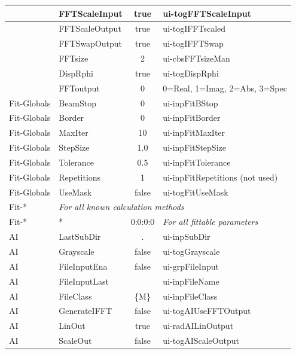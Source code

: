\documentclass[11pt]{article} %
\begin{document}
\begin{longtable}{|l|l|c|l|}
 & FFTScaleInput & true & ui-togFFTScaleInput \\ \hline
 & FFTScaleOutput & true & ui-togIFFTscaled \\ \hline
 & FFTSwapOutput & true & ui-togIFFTSwap \\ \hline
 & FFTsize & 2 & ui-cbsFFTsizeMan \\ \hline
 & DispRphi & true & ui-togDispRphi \\ \hline
 & FFToutput & 0 & 0=Real, 1=Imag, 2=Abs, 3=Spec \\ \hline
Fit-Globals & BeamStop & 0 & ui-inpFitBStop \\ \hline
Fit-Globals & Border & 0 & ui-inpFitBorder \\ \hline
Fit-Globals & MaxIter & 10 & ui-inpFitMaxIter \\ \hline
Fit-Globals & StepSize & 1.0 & ui-inpFitStepSize \\ \hline
Fit-Globals & Tolerance & 0.5 & ui-inpFitTolerance \\ \hline
Fit-Globals & Repetitions & 1 & ui-inpFitRepetitions (not used) \\ \hline
Fit-Globals & UseMask & false & ui-togFitUseMask \\ \hline
Fit-* & \multicolumn{3}{l|}{\it For all known calculation methods} \\ \hline
Fit-* & * & 0:0:0:0 & {\it For all fittable parameters} \\ \hline
AI & LastSubDir & . & ui-inpSubDir \\ \hline
AI & Grayscale & false & ui-togGrayscale \\ \hline
AI & FileInputEna & false & ui-grpFileInput \\ \hline
AI & FileInputLast & & ui-inpFileName \\ \hline
AI & FileClass & \{M\} & ui-inpFileClass \\ \hline
AI & GenerateIFFT & false & ui-togAIUseFFTOutput \\ \hline
AI & LinOut & true & ui-radAILinOutput \\ \hline
AI & ScaleOut & false & ui-togAIScaleOutput \\ \hline

\end{longtable}
\end{document}
